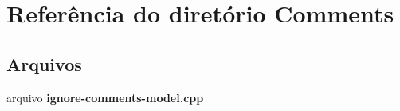 \section{Referência do diretório Comments}
\label{dir_05d356e692671537f3c2d4691ed4efb1}
\subsection*{Arquivos}
\begin{DoxyCompactItemize}
\item 
arquivo {\bf ignore-\/comments-\/model.\+cpp}
\end{DoxyCompactItemize}
